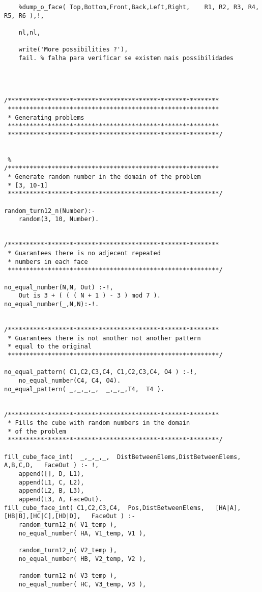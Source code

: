 \begin{lstlisting}
	%dump_o_face( Top,Bottom,Front,Back,Left,Right,    R1, R2, R3, R4, R5, R6 ),!,
	
	nl,nl,

	write('More possibilities ?'),
	fail. % falha para verificar se existem mais possibilidades	
	
	
	
	
/**********************************************************
 **********************************************************
 * Generating problems
 **********************************************************
 **********************************************************/
 
 
 %
/**********************************************************
 * Generate random number in the domain of the problem
 * [3, 10-1]
 **********************************************************/
 
random_turn12_n(Number):-
	random(3, 10, Number).
	
	
/**********************************************************
 * Guarantees there is no adjecent repeated
 * numbers in each face
 **********************************************************/
 
no_equal_number(N,N, Out) :-!,
	Out is 3 + ( ( ( N + 1 ) - 3 ) mod 7 ).
no_equal_number(_,N,N):-!.	


/**********************************************************
 * Guarantees there is not another not another pattern
 * equal to the original
 **********************************************************/
 
no_equal_pattern( C1,C2,C3,C4, C1,C2,C3,C4, O4 ) :-!,
	no_equal_number(C4, C4, O4).
no_equal_pattern( _,_,_,_,  _,_,_,T4,  T4 ).


/**********************************************************
 * Fills the cube with random numbers in the domain
 * of the problem
 **********************************************************/

fill_cube_face_int(  _,_,_,_,  DistBetweenElems,DistBetweenElems,   A,B,C,D,   FaceOut ) :- !,
	append([], D, L1),
	append(L1, C, L2),
	append(L2, B, L3),
	append(L3, A, FaceOut).
fill_cube_face_int( C1,C2,C3,C4,  Pos,DistBetweenElems,   [HA|A],[HB|B],[HC|C],[HD|D],   FaceOut ) :-
	random_turn12_n( V1_temp ),
	no_equal_number( HA, V1_temp, V1 ),
		
	random_turn12_n( V2_temp ),
	no_equal_number( HB, V2_temp, V2 ),
	
	random_turn12_n( V3_temp ),
	no_equal_number( HC, V3_temp, V3 ),
	

\end{lstlisting}
